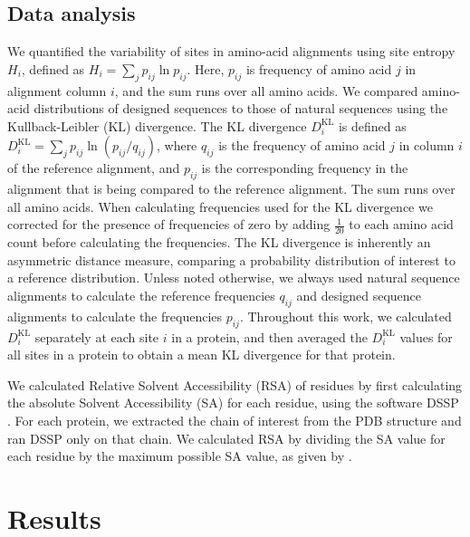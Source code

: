 \documentclass[12pt]{article}
\begin{document}
\subsection{Data analysis}

We quantified the variability of sites in amino-acid alignments using site entropy $H_i$, defined as $H_i=\sum_{j}p_{ij}\ln p_{ij}$. Here, $p_{ij}$ is frequency of amino acid $j$ in alignment column $i$, and the sum runs over all amino acids. We compared amino-acid distributions of designed sequences to those of natural sequences using the Kullback-Leibler (KL) divergence. The KL divergence $D^\text{KL}_i$ is defined as $D^\text{KL}_i= \sum_j  p_{ij} \ln  (p_{ij}/q_{ij})$, where $q_{ij}$ is the frequency of amino acid $j$ in column $i$ of the reference alignment, and $p_{ij}$ is the corresponding frequency in the alignment that is being compared to the reference alignment. The sum runs over all amino acids.  When calculating frequencies used for the KL divergence we corrected for the presence of frequencies of zero by adding  $\frac{1}{20}$ to each amino acid count before calculating the frequencies. The KL divergence is inherently an asymmetric distance measure, comparing a probability distribution of interest to a reference distribution. Unless noted otherwise, we always used natural sequence alignments to calculate the reference frequencies $q_{ij}$ and designed sequence alignments to calculate the frequencies $p_{ij}$. Throughout this work, we calculated $D^\text{KL}_i$ separately at each site $i$ in a protein, and then averaged the $D^\text{KL}_i$ values for all sites in a protein to obtain a mean KL divergence for that protein. 

We calculated Relative Solvent Accessibility (RSA) of residues by first calculating the absolute Solvent Accessibility (SA) for each residue, using the software DSSP \citep{Kabsch1983}. For each protein, we extracted the chain of interest from the PDB structure and ran DSSP only on that chain. We calculated RSA by dividing the SA value for each residue by the maximum possible SA value, as given by \citet{Tien}. 

\section{Results}
\label{Results}
\end{document}
